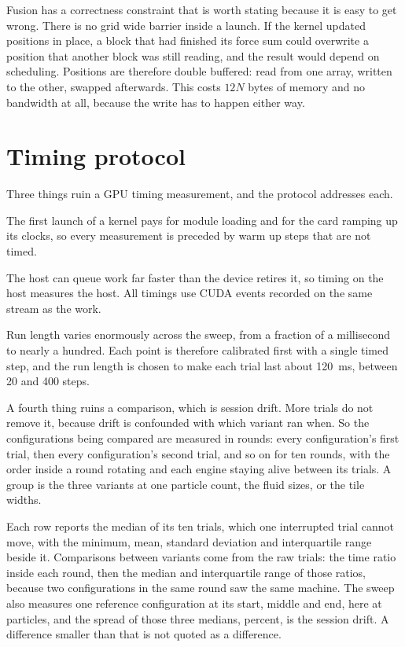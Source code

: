 Fusion has a correctness constraint that is worth stating because it is easy to
get wrong. There is no grid wide barrier inside a launch. If the kernel updated
positions in place, a block that had finished its force sum could overwrite a
position that another block was still reading, and the result would depend on
scheduling. Positions are therefore double buffered: read from one array,
written to the other, swapped afterwards. This costs $12N$ bytes of memory and
no bandwidth at all, because the write has to happen either way.

\section{Timing protocol}

Three things ruin a GPU timing measurement, and the protocol addresses each.

The first launch of a kernel pays for module loading and for the card ramping
up its clocks, so every measurement is preceded by warm up steps that are not
timed.

The host can queue work far faster than the device retires it, so timing on the
host measures the host. All timings use CUDA events recorded on the same stream
as the work.

Run length varies enormously across the sweep, from a fraction of a millisecond
to nearly a hundred. Each point is therefore calibrated first with a single
timed step, and the run length is chosen to make each trial last about
\SI{120}{\milli\second}, between 20 and 400 steps.

A fourth thing ruins a comparison, which is session drift. More trials do not remove
it, because drift is confounded with which variant ran when. So the configurations
being compared are measured in rounds: every configuration's first trial, then every
configuration's second trial, and so on for ten rounds, with the order inside a round
rotating and each engine staying alive between its trials. A group is the three
variants at one particle count, the fluid sizes, or the tile widths.

Each row reports the median of its ten trials, which one interrupted trial cannot move,
with the minimum, mean, standard deviation and interquartile range beside it. Comparisons
between variants come from the raw trials: the time ratio inside each round, then the
median and interquartile range of those ratios, because two configurations in the same
round saw the same machine. The sweep also measures one reference configuration at its
start, middle and end, here \RepeatabilityVariant{} at \RepeatabilityParticles{} particles,
and the spread of those three medians, \RepeatabilitySpread{} percent, is the session
drift. A difference smaller than that is not quoted as a difference.

